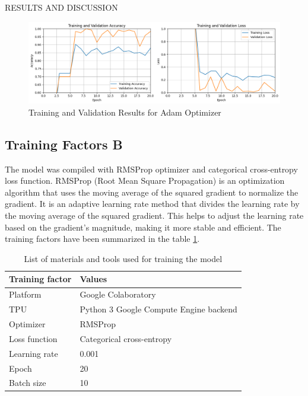 \begin{section}[]{\uppercase{Results and Discussion}}
\begin{figure}[H]
    \centering
    \includegraphics[width=\linewidth]{images/result.png}
    \caption{Training and Validation Results for Adam Optimizer}
    \label{fig:result}
\end{figure}

\subsection{Training Factors B}
The model was compiled with RMSProp optimizer and categorical cross-entropy loss function. RMSProp (Root Mean Square Propagation) is an optimization algorithm that uses the moving average of the squared gradient to normalize the gradient. It is an adaptive learning rate method that divides the learning rate by the moving average of the squared gradient. This helps to adjust the learning rate based on the gradient's magnitude, making it more stable and efficient.
The training factors have been summarized in the table \ref{tab:training_factors_b}.
\begin{table}[H]
    \centering
    \begin{tabular}{ll}
        \toprule
        \textbf{Training factor} & \textbf{Values} \\
        \midrule
        Platform & Google Colaboratory \\
        TPU & Python 3 Google Compute Engine backend \\
        Optimizer & RMSProp \\
        Loss function & Categorical cross-entropy \\
        Learning rate & 0.001 \\
        Epoch & 20 \\
        Batch size & 10 \\
        \bottomrule
    \end{tabular}
    \caption{List of materials and tools used for training the model}
    \label{tab:training_factors_b}
\end{table}




\end{section}
